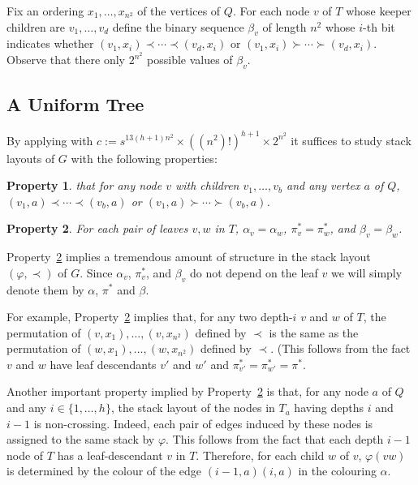 \documentclass[kpfonts]{patmorin}
\newtheorem{property}{Property}
\newcommand{\plabel}[1]{\label{prop:#1}}
\newcommand{\pref}[1]{Property~\ref{prop:#1}}
\begin{document}
Fix an ordering $x_1,\ldots,x_{n^2}$ of the vertices of $Q$.  For each node $v$ of $T$ whose keeper children are $v_1,\ldots,v_d$ define the  binary sequence $\beta_v$ of length $n^2$ whose $i$-th bit indicates whether $(v_1,x_i)\prec\cdots\prec(v_d,x_i)$ or $(v_1,x_i)\succ\cdots\succ(v_d,x_i)$.  Observe that there only $2^{n^2}$ possible values of $\beta_v$.


\subsection{A Uniform Tree}

By applying  with $c:=
s^{13(h+1)n^2}\times ((n^2)!)^{h+1}\times 2^{n^2}$ it suffices to study stack layouts of $G$ with the following properties:

\begin{property}\plabel{flip-or-flop}
    that for any node $v$ with children $v_1,\ldots,v_b$ and any vertex $a$ of $Q$, $(v_1,a)\prec\cdots\prec(v_b,a)$ or $(v_1,a)\succ\cdots\succ(v_b,a)$.
\end{property}

\begin{property}\plabel{uniform}
    For each pair of leaves $v,w$ in $T$, $\alpha_v=\alpha_w$, $\pi^*_v=\pi^*_w$, and $\beta_v=\beta_w$.
\end{property}

\pref{uniform} implies a tremendous amount of structure in the stack layout $(\varphi,\prec)$ of $G$.  Since $\alpha_v$, $\pi^*_v$, and $\beta_v$ do not depend on the leaf $v$ we will simply denote them by $\alpha$, $\pi^*$ and $\beta$.

For example, \pref{uniform} implies that, for any two depth-$i$ $v$ and $w$ of $T$, the permutation of $(v,x_1),\ldots,(v,{x_{n^2}})$ defined by $\prec$ is the same as the permutation of $(w,x_1),\ldots,(w,{x_{n^2}})$ defined by $\prec$.  (This follows from the fact $v$ and $w$ have leaf descendants $v'$ and $w'$ and $\pi^*_{v'}=\pi^*_{w'}=\pi^*$.

Another important property implied by \pref{uniform} is that, for any node $a$ of $Q$ and any $i\in\{1,\ldots,h\}$, the stack layout of the nodes in $T_a$ having depths $i$ and $i-1$ is non-crossing.  Indeed, each pair of edges induced by these nodes is assigned to the same stack by $\varphi$.  This follows from the fact that each depth $i-1$ node of $T$ has a leaf-descendant $v$ in $T$. Therefore, for each child $w$ of $v$, $\varphi(vw)$ is determined by the colour of the edge $(i-1,a)(i,a)$ in the colouring $\alpha$.
\end{document}
